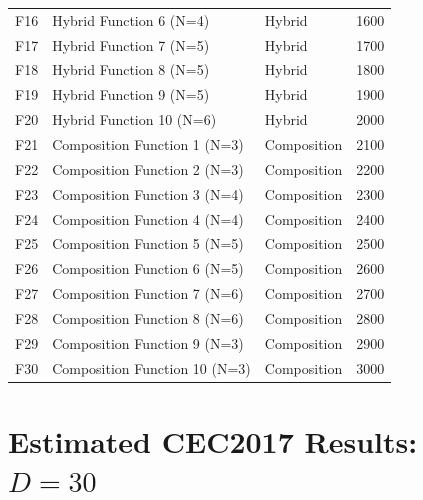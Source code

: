 \documentclass[11pt]{article}
\begin{document}
\begin{table}[ht]
\begin{tabular}{@{}clll@{}}
F16 & Hybrid Function 6 (N=4)                 & Hybrid        & 1600 \\
F17 & Hybrid Function 7 (N=5)                 & Hybrid        & 1700 \\
F18 & Hybrid Function 8 (N=5)                 & Hybrid        & 1800 \\
F19 & Hybrid Function 9 (N=5)                 & Hybrid        & 1900 \\
F20 & Hybrid Function 10 (N=6)                & Hybrid        & 2000 \\
\midrule
F21 & Composition Function 1 (N=3)            & Composition   & 2100 \\
F22 & Composition Function 2 (N=3)            & Composition   & 2200 \\
F23 & Composition Function 3 (N=4)            & Composition   & 2300 \\
F24 & Composition Function 4 (N=4)            & Composition   & 2400 \\
F25 & Composition Function 5 (N=5)            & Composition   & 2500 \\
F26 & Composition Function 6 (N=5)            & Composition   & 2600 \\
F27 & Composition Function 7 (N=6)            & Composition   & 2700 \\
F28 & Composition Function 8 (N=6)            & Composition   & 2800 \\
F29 & Composition Function 9 (N=3)            & Composition   & 2900 \\
F30 & Composition Function 10 (N=3)           & Composition   & 3000 \\
\bottomrule
\end{tabular}
\end{table}

\section{Estimated CEC2017 Results: $D=30$}
\end{document}
